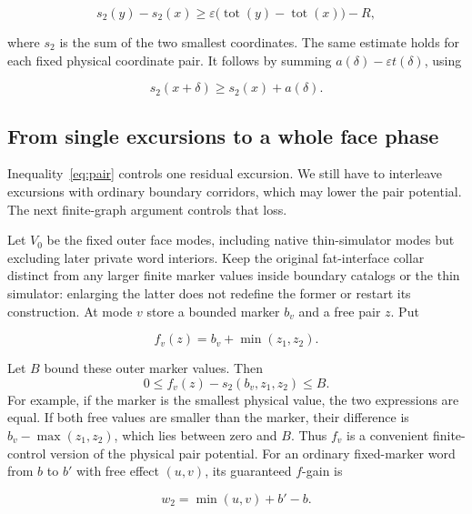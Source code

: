 \documentclass[11pt,a4paper]{article}
\theoremstyle{remark}
\newcommand{\tot}[1]{\operatorname{tot}(#1)}
\begin{document}
\begin{equation}
s_2(y)-s_2(x)\geq \varepsilon\bigl(\tot y-\tot x\bigr)-R, \label{eq:pair}
\end{equation}


where \(s_2\) is the sum of the two smallest coordinates. The same estimate holds for each fixed physical coordinate pair. It follows by summing \(a(\delta)-\varepsilon t(\delta)\), using

\begin{equation*}
s_2(x+\delta)\geq s_2(x)+a(\delta).
\end{equation*}


\subsection{From single excursions to a whole face phase}

Inequality~\eqref{eq:pair} controls one residual excursion. We still
have to interleave excursions with ordinary boundary corridors, which
may lower the pair potential. The next finite-graph argument controls
that loss.

Let \(V_0\) be the fixed outer face modes, including native thin-simulator modes but excluding later private word interiors. Keep the original fat-interface collar distinct from any larger finite marker values inside boundary catalogs or the thin simulator: enlarging the latter does not redefine the former or restart its construction. At mode \(v\) store a bounded marker \(b_v\) and a free pair \(z\). Put

\begin{equation*}
f_v(z)=b_v+\min(z_1,z_2).
\end{equation*}


Let \(B\) bound these outer marker values. Then
\[
 0\le f_v(z)-s_2(b_v,z_1,z_2)\le B.
\]
For example, if the marker is the smallest physical value, the two
expressions are equal. If both free values are smaller than the
marker, their difference is \(b_v-\max(z_1,z_2)\), which lies between
zero and \(B\). Thus \(f_v\) is a convenient finite-control version
of the physical pair potential. For an ordinary fixed-marker word from \(b\) to \(b'\) with free effect \((u,v)\), its guaranteed \(f\)-gain is

\begin{equation}
w_2=\min(u,v)+b'-b. \label{eq:ordinary-weight}
\end{equation}
\end{document}
